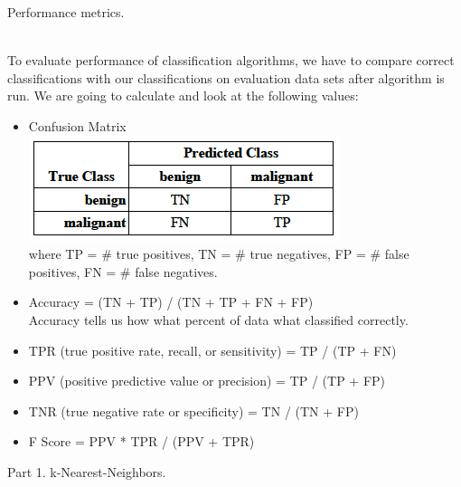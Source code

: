 \documentclass[12pt, letterpaper]{article}
\begin{document}
\begin{enumerate}[label=\Roman*.]
	{\bf \item Performance metrics.}\\
	
	To evaluate performance of  classification algorithms, we have to compare correct classifications with our classifications on evaluation data sets after algorithm is run. We are going to calculate and look at the following values: 
	\begin{itemize}
		\item Confusion Matrix \\
		
		\includegraphics[scale=0.7]{../images/1.png} \\
		where TP = \# true positives, TN = \# true negatives, FP = \# false positives, FN = \# false negatives.\\
		
		\item Accuracy = (TN + TP) / (TN + TP + FN + FP)\\
		Accuracy tells us how what percent of data what classified correctly. \\
		\item TPR (true positive rate, recall, or sensitivity) = TP / (TP + FN)\\
		\item PPV (positive predictive value or precision) = TP / (TP + FP)\\
		\item TNR (true negative rate or specificity) = TN / (TN + FP)\\
		\item F Score = PPV * TPR / (PPV + TPR)\\
	\end{itemize}
	
	{\bf \item Part 1. k-Nearest-Neighbors. }\\
	

\end{enumerate}
\end{document}
